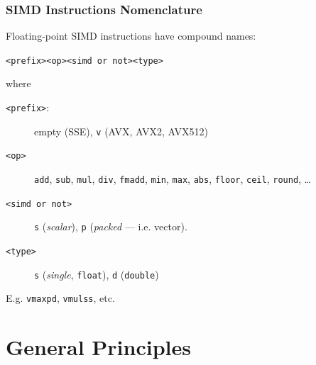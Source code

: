 \documentclass[xcolor={x11names,svgnames}]{beamer}
\newcommand{\red}[1]{{\color{red}#1}}
\begin{document}

\begin{frame}[fragile=singleslide]
  \frametitle{SIMD Instructions Nomenclature}
  
\red{Floating-point} SIMD instructions have compound names:
\begin{center}
  \verb|<prefix><op><simd or not><type>|
\end{center}
where
\begin{description}
\item[\texttt{<prefix>}:] empty (SSE), \texttt{v} (AVX, AVX2, AVX512)
\item[\texttt{<op>}] \texttt{add}, \texttt{sub}, \texttt{mul}, \texttt{div}, \texttt{fmadd}, \texttt{min}, \texttt{max}, \texttt{abs}, \texttt{floor}, \texttt{ceil}, \texttt{round}, \dots
\item[\texttt{<simd or not>}] \texttt{s} (\textit{scalar}), \texttt{p} (\textit{packed} --- i.e. vector).
\item[\texttt{<type>}] \texttt{s} (\textit{single}, \texttt{float}), \texttt{d} (\texttt{double})
\end{description}

\bigskip

E.g. \texttt{vmaxpd}, \texttt{vmulss}, etc.

\end{frame}


\section{General Principles}
\end{document}
